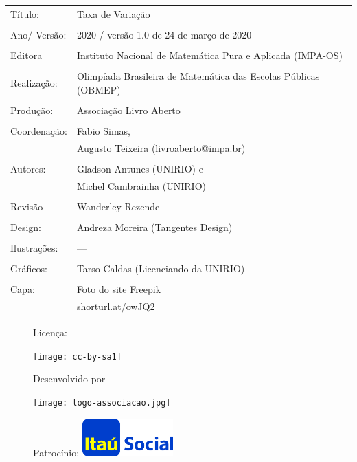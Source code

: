 \begin{tabular}{p{}p{}}
Título: & Taxa de Variação\\
\\
Ano/ Versão: & 2020 / versão 1.0 de 24 de março de 2020\\
\\
Editora & Instituto Nacional de Matem\'atica Pura e Aplicada (IMPA-OS)\\
\\
Realização:& Olimp\'iada Brasileira de Matem\'atica das Escolas P\'ublicas (OBMEP)\\
\\
Produção:& Associação Livro Aberto\\
\\
Coordenação:& Fabio Simas, \\ 
			& Augusto Teixeira (livroaberto@impa.br)\\
\\
Autores: & Gladson Antunes (UNIRIO) e\\
         & Michel Cambrainha (UNIRIO) \\
\\
Revisão &  Wanderley Rezende\\
                
\\
Design: & Andreza Moreira (Tangentes Design) \\
\\
  Ilustrações: & --- \\ 
\\
Gráficos: & Tarso Caldas (Licenciando da UNIRIO)\\
\\
  Capa: & Foto do site Freepik \\
  		& shorturl.at/owJQ2 \\

\end{tabular}

\begin{figure}[b]
\begin{minipage}[l]{5cm}
\centering

{\large Licença:}

  \texttt{[image: cc-by-sa1]}
\end{minipage}\hfill
\begin{minipage}[c]{5cm}
\centering
{\large Desenvolvido por}

\texttt{[image: logo-associacao.jpg]}
\end{minipage}
\begin{minipage}[r]{5cm}
\centering

{\large Patrocínio:}
  \vspace{1em}
  \includegraphics[width=3.5cm]{itau}
\end{minipage}
\end{figure}


